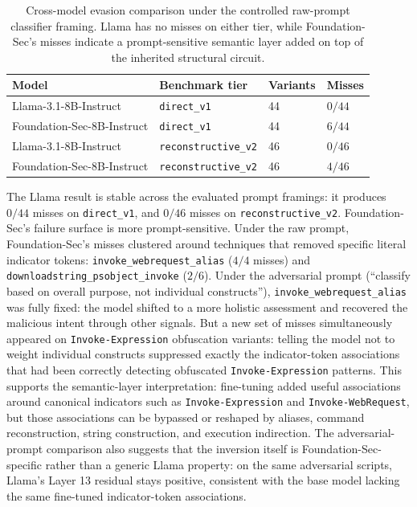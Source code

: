 \documentclass{article}
\begin{document}
\begin{table}[!htbp]
\centering
\caption{Cross-model evasion comparison under the controlled raw-prompt classifier framing. Llama has no misses on either tier, while Foundation-Sec's misses indicate a prompt-sensitive semantic layer added on top of the inherited structural circuit.}
\label{tab:cross-model-evasion}
\begin{tabular}{llll}
\toprule
Model & Benchmark tier & Variants & Misses \\
\midrule
Llama-3.1-8B-Instruct & \texttt{direct\_v1} & 44 & \(0/44\) \\
Foundation-Sec-8B-Instruct & \texttt{direct\_v1} & 44 & \(6/44\) \\
Llama-3.1-8B-Instruct & \texttt{reconstructive\_v2} & 46 & \(0/46\) \\
Foundation-Sec-8B-Instruct & \texttt{reconstructive\_v2} & 46 & \(4/46\) \\
\bottomrule
\end{tabular}
\end{table}


The Llama result is stable across the evaluated prompt framings: it produces \(0/44\) misses on \texttt{direct\_v1}, and \(0/46\) misses on \texttt{reconstructive\_v2}. Foundation-Sec's failure surface is more prompt-sensitive. Under the raw prompt, Foundation-Sec's misses clustered around techniques that removed specific literal indicator tokens: \texttt{invoke\_webrequest\_alias} (\(4/4\) misses) and \texttt{downloadstring\_psobject\_invoke} (\(2/6\)). Under the adversarial prompt (``classify based on overall purpose, not individual constructs''), \texttt{invoke\_webrequest\_alias} was fully fixed: the model shifted to a more holistic assessment and recovered the malicious intent through other signals. But a new set of misses simultaneously appeared on \texttt{Invoke-Expression} obfuscation variants: telling the model not to weight individual constructs suppressed exactly the indicator-token associations that had been correctly detecting obfuscated \texttt{Invoke-Expression} patterns. This supports the semantic-layer interpretation: fine-tuning added useful associations around canonical indicators such as \texttt{Invoke-Expression} and \texttt{Invoke-WebRequest}, but those associations can be bypassed or reshaped by aliases, command reconstruction, string construction, and execution indirection. The adversarial-prompt comparison also suggests that the inversion itself is Foundation-Sec-specific rather than a generic Llama property: on the same adversarial scripts, Llama's Layer 13 residual stays positive, consistent with the base model lacking the same fine-tuned indicator-token associations.
\end{document}
